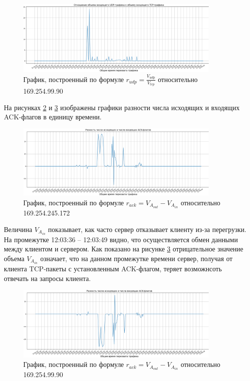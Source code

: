 \documentclass[bachelor, och, coursework]{SCWorks}
\begin{document}
  \begin{figure}[H]
    \centering
    \includegraphics[width=0.9\textwidth]{photo/serv2.png}
    \caption{График, построенный по формуле $r_{udp} = \frac{V_{udp}}{V_{tcp}}$ относительно 169.254.99.90}
    \label{serv2}
  \end{figure}

  На рисунках \ref{clnt3} и \ref{serv3} изображены графики разности числа исходящих и входящих ACK-флагов в единицу времени.

  \begin{figure}[H]
    \centering
    \includegraphics[width=0.9\textwidth]{photo/clnt3.png}
    \caption{График, построенный по формуле $r_{ack} = V_{A_{out}} - V_{A_{in}}$ относительно 169.254.245.172}
    \label{clnt3}
  \end{figure}

  Величина $V_{A_{in}}$ показывает, как часто сервер отказывает клиенту из-за перегрузки. На промежутке 12:03:36 -- 12:03:49 видно, что 
  осуществляется обмен данными между клиентом и сервером. Как показано на рисунке \ref{serv3} отрицательное значение объема $V_{A_{in}}$
  означает, что на данном промежутке времени сервер, получая от клиента TCP-пакеты с установленным ACK-флагом, теряет возможнсоть
  отвечать на запросы клиента. 

  \begin{figure}[H]
    \centering
    \includegraphics[width=0.9\textwidth]{photo/serv3.png}
    \caption{График, построенный по формуле $r_{ack} = V_{A_{out}} - V_{A_{in}}$ относительно 169.254.99.90}
    \label{serv3}
  \end{figure}
\end{document}
